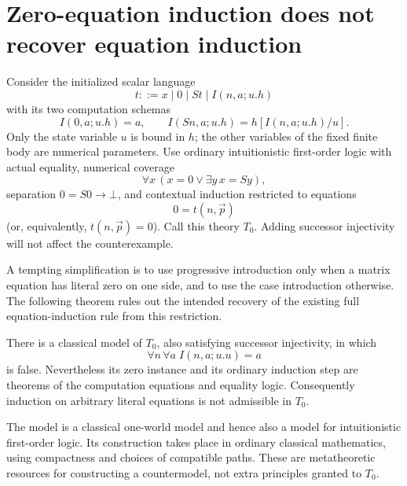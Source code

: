 
\section{Zero-equation induction does not recover equation induction}
\label{zi:section}

Consider the initialized scalar language
\[
t::=x\mid0\mid St\mid I(n,a;u.h)
\]
with its two computation schemas
\[
I(0,a;u.h)=a,\qquad
I(Sn,a;u.h)=h[I(n,a;u.h)/u].
\]
Only the state variable \(u\) is bound in \(h\); the other variables of the fixed finite body are numerical parameters. Use ordinary intuitionistic first-order logic with actual equality, numerical coverage
\[
\forall x\,(x=0\lor\exists y\,x=Sy),
\]
separation \(0=S0\to\bot\), and contextual induction restricted to equations
\[
0=t(n,\vec p)
\]
(or, equivalently, \(t(n,\vec p)=0\)). Call this theory \(T_0\).
Adding successor injectivity will not affect the counterexample.

A tempting simplification is to use progressive introduction only when a matrix equation has literal zero on one side, and to use the case introduction otherwise. The following theorem rules out the intended recovery of the existing full equation-induction rule from this restriction.

\begin{theorem}
\label{zi:main}
There is a classical model of \(T_0\), also satisfying successor injectivity, in which
\[
\forall n\,\forall a\; I(n,a;u.u)=a
\]
is false. Nevertheless its zero instance and its ordinary induction step are theorems of the computation equations and equality logic.
Consequently induction on arbitrary literal equations is not admissible in \(T_0\).
\end{theorem}

The model is a classical one-world model and hence also a model for intuitionistic first-order logic. Its construction takes place in ordinary classical mathematics, using compactness and choices of compatible paths. These are metatheoretic resources for constructing a countermodel, not extra principles granted to \(T_0\).

